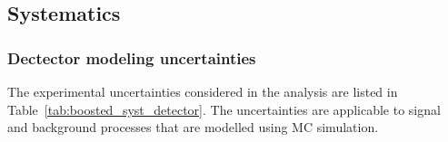\newpage
  
\subsection{Systematics}
\label{sec:boosted_systematics}
\subsubsection{Dectector modeling uncertainties}
\label{sec:boosted_syst_detector}
 
The experimental uncertainties considered in the analysis are listed in Table~\ref{tab:boosted_syst_detector}.
The uncertainties are applicable to signal and background processes that are modelled using MC simulation.
 
\begin{table}
\resizebox{\textwidth}{!}
{
\begin{tabular}{l|l}
 

\end{tabular}}
\end{table}
